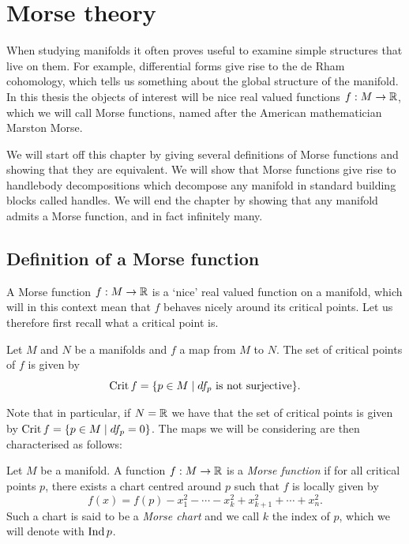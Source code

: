 \chapter{Morse theory}
\label{chap:morse-theory}
\vspace*{-0.9cm}


When studying manifolds it often proves useful to examine simple structures that live on them. For example, differential forms give rise to the de Rham cohomology, which tells us something about the global structure of the manifold.
In this thesis the objects of interest will be nice real valued functions $f: M \to  \mathbb{R}$, which we will call Morse functions, named after the American mathematician Marston Morse.

We will start off this chapter by giving several definitions of Morse functions and showing that they are equivalent.
We will show that Morse functions give rise to handlebody decompositions which decompose any manifold in standard building blocks called handles.
We will end the chapter by showing that any manifold admits a Morse function, and in fact infinitely many.

\section{Definition of a Morse function}

A Morse function $f: M \to \mathbb{R}$ is a `nice' real valued function on a manifold, which will in this context mean that $f$ behaves nicely around its critical points. Let us therefore first recall what a critical point is.

\begin{definition}
    Let $M$ and $N$ be a manifolds and  $f$ a map from $M$ to $N$.
    The set of critical points of $f$ is given by
    \[
    \operatorname{Crit} f = \{p \in M  \mid \text{$df_p$ is not surjective}\} 
    .\] 
\end{definition}
Note that in particular, if $N = \mathbb{R}$ we have that the set of critical points is given by $\operatorname{Crit} f = \{ p \in M  \mid  df_p = 0\}$.  The maps we will be considering are then characterised as follows:
\begin{definition}
    Let $M$ be a manifold.
    A function $f: M \to  \mathbb{R}$ is a \emph{Morse function} if for all critical points $p$, there exists a chart centred around $p$ such that $f$ is locally given by
    \[
        f(x) = f(p) -x_1^2 - \cdots - x_k^2 + x_{k+1}^2 + \cdots + x_n^2
    .\] 
    Such a chart is said to be a \emph{Morse chart} and we call $k$ the index of $p$, which we will denote with $\operatorname{Ind} p$.
\end{definition}

